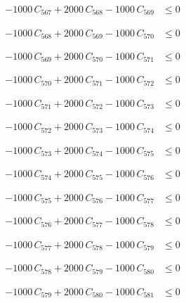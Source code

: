\documentclass[a4paper,11pt]{article}
\begin{document}
\begin{align}
-1000\,C_{567} + 2000\,C_{568} - 1000\,C_{569} &\leq 0 \nonumber
\end{align}

\begin{align}
-1000\,C_{568} + 2000\,C_{569} - 1000\,C_{570} &\leq 0 \nonumber
\end{align}

\begin{align}
-1000\,C_{569} + 2000\,C_{570} - 1000\,C_{571} &\leq 0 \nonumber
\end{align}

\begin{align}
-1000\,C_{570} + 2000\,C_{571} - 1000\,C_{572} &\leq 0 \nonumber
\end{align}

\begin{align}
-1000\,C_{571} + 2000\,C_{572} - 1000\,C_{573} &\leq 0 \nonumber
\end{align}

\begin{align}
-1000\,C_{572} + 2000\,C_{573} - 1000\,C_{574} &\leq 0 \nonumber
\end{align}

\begin{align}
-1000\,C_{573} + 2000\,C_{574} - 1000\,C_{575} &\leq 0 \nonumber
\end{align}

\begin{align}
-1000\,C_{574} + 2000\,C_{575} - 1000\,C_{576} &\leq 0 \nonumber
\end{align}

\begin{align}
-1000\,C_{575} + 2000\,C_{576} - 1000\,C_{577} &\leq 0 \nonumber
\end{align}

\begin{align}
-1000\,C_{576} + 2000\,C_{577} - 1000\,C_{578} &\leq 0 \nonumber
\end{align}

\begin{align}
-1000\,C_{577} + 2000\,C_{578} - 1000\,C_{579} &\leq 0 \nonumber
\end{align}

\begin{align}
-1000\,C_{578} + 2000\,C_{579} - 1000\,C_{580} &\leq 0 \nonumber
\end{align}

\begin{align}
-1000\,C_{579} + 2000\,C_{580} - 1000\,C_{581} &\leq 0 \nonumber
\end{align}
\end{document}
